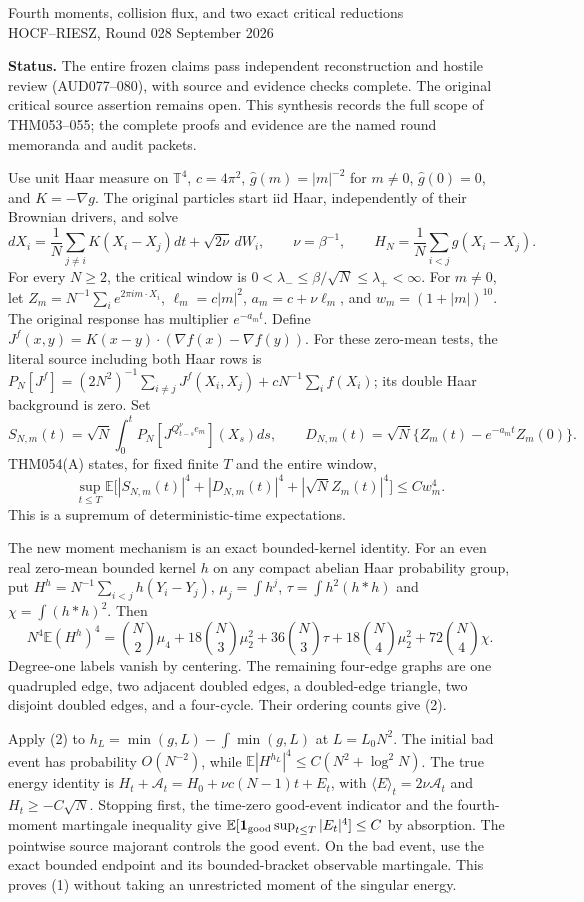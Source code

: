 \documentclass[11pt]{article}
\newcommand{\E}{\mathbb E}
\begin{document}
\begin{center}
{\large Fourth moments, collision flux, and two exact critical reductions}\\[4pt]
HOCF--RIESZ, Round 028  September 2026
\end{center}
\noindent\textbf{Status.} The entire frozen claims pass independent reconstruction and hostile review (AUD077--080), with source and evidence checks complete. The original critical source assertion remains open. This synthesis records the full scope of THM053--055; the complete proofs and evidence are the named round memoranda and audit packets.

Use unit Haar measure on $\mathbb T^4$, $c=4\pi^2$,
$\widehat g(m)=|m|^{-2}$ for $m\ne0$, $\widehat g(0)=0$, and $K=-\nabla g$.
The original particles start iid Haar, independently of their Brownian drivers, and solve
\[
 dX_i=\frac1N\sum_{j\ne i}K(X_i-X_j)dt+\sqrt{2\nu}\,dW_i,
 \qquad \nu=\beta^{-1},\qquad
 H_N=\frac1N\sum_{i<j}g(X_i-X_j).
\]
For every $N\ge2$, the critical window is $0<\lambda_-\le\beta/\sqrt N\le\lambda_+<\infty$.
For $m\ne0$, let $Z_m=N^{-1}\sum_i e^{2\pi i m\cdot X_i}$,
$\ell_m=c|m|^2$, $a_m=c+\nu\ell_m$, and $w_m=(1+|m|)^{10}$.
The original response has multiplier $e^{-a_mt}$. Define
$J^f(x,y)=K(x-y)\cdot(\nabla f(x)-\nabla f(y))$.
For these zero-mean tests, the literal source including both Haar rows is
$P_N[J^f]=(2N^2)^{-1}\sum_{i\ne j}J^f(X_i,X_j)+cN^{-1}\sum_i f(X_i)$;
its double Haar background is zero. Set
\[
 S_{N,m}(t)=\sqrt N\int_0^tP_N[J^{Q_{t-s}^\nu e_m}](X_s)ds,
 \qquad D_{N,m}(t)=\sqrt N\{Z_m(t)-e^{-a_mt}Z_m(0)\}.
\]
THM054(A) states, for fixed finite $T$ and the entire window,
\[
 \sup_{t\le T}\E\bigl[|S_{N,m}(t)|^4+|D_{N,m}(t)|^4
                  +|\sqrt N Z_m(t)|^4\bigr]\le Cw_m^4.\tag{1}
\]
This is a supremum of deterministic-time expectations.

The new moment mechanism is an exact bounded-kernel identity. For an even real zero-mean bounded kernel $h$ on any compact abelian Haar probability group, put $H^h=N^{-1}\sum_{i<j}h(Y_i-Y_j)$, $\mu_j=\int h^j$, $\tau=\int h^2(h*h)$ and $\chi=\int(h*h)^2$. Then
\[
 N^4\E(H^h)^4=\binom{N}{2}\mu_4+18\binom{N}{3}\mu_2^2
 +36\binom{N}{3}\tau+18\binom{N}{4}\mu_2^2+72\binom{N}{4}\chi.\tag{2}
\]
Degree-one labels vanish by centering. The remaining four-edge graphs are one quadrupled edge, two adjacent doubled edges, a doubled-edge triangle, two disjoint doubled edges, and a four-cycle. Their ordering counts give (2).

Apply (2) to $h_L=\min(g,L)-\int\min(g,L)$ at $L=L_0N^2$.
The initial bad event has probability $O(N^{-2})$, while
$\E|H^{h_L}|^4\le C(N^2+\log^2N)$.
The true energy identity is $H_t+\mathcal A_t=H_0+\nu c(N-1)t+E_t$, with
$\langle E\rangle_t=2\nu\mathcal A_t$ and $H_t\ge-C\sqrt N$.
Stopping first, the time-zero good-event indicator and the fourth-moment martingale inequality give $\E[\mathbf1_{\rm good}\sup_{t\le T}|E_t|^4]\le C$ by absorption. The pointwise source majorant controls the good event. On the bad event, use the exact bounded endpoint and its bounded-bracket observable martingale. This proves (1) without taking an unrestricted moment of the singular energy.
\end{document}
